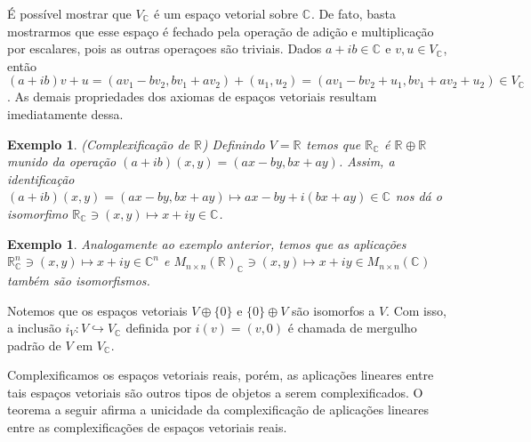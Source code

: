 \documentclass[12pt]{book}
\newtheorem{exemplo}[teorema]{Exemplo}
\newcommand{\complexificacao}[1]{#1_{\complexo{}}}
\newcommand{\complexo}[1]{\mathbb{C}^{#1}}
\newcommand{\matrizquadcomplexa}[1]{M_{#1 \times #1}(\complexo{})}
\newcommand{\matrizquadreal}[1]{M_{#1 \times #1}(\real{})}
\newcommand{\real}[1]{\mathbb{R}^{#1}}
\newcommand{\reta}{\real{}}
\begin{document}
	É possível mostrar que $\complexificacao{V}$ é um espaço vetorial sobre $\complexo{}$. De fato, basta mostrarmos que esse espaço é fechado pela operação de adição e multiplicação por escalares, pois as outras operaçoes são triviais. Dados $a+ib \in \complexo{}$ e $v,u \in \complexificacao{V}$, então $(a+ib )v+u = (av_{1}-bv_{2}, bv_{1}+ av_{2}) + (u_{1}, u_{2}) = (av_{1}-bv_{2} + u_{1}, bv_{1}+ av_{2} + u_{2}) \in \complexificacao{V}$. As demais propriedades dos axiomas de espaços vetoriais resultam imediatamente dessa.
	
	\begin{exemplo}\label{exemplo_conjugado_reta_real}
		(Complexificação de $\reta$) Definindo $V = \reta$ temos que $\complexificacao{\reta}$ é $\reta\oplus \reta$ munido da operação $(a+ib)(x,y) = (ax-by, bx+ay)$. Assim, a identificação $(a+ib)(x, y ) = (ax-by, bx+ay) \mapsto ax-by+i(bx+ay) \in \complexo{}$ nos dá o isomorfimo $\complexificacao{\reta} \ni (x,y)\mapsto x +iy\in \complexo{}$.
	\end{exemplo}
	
	\begin{exemplo}\label{exemplo_complexificacao_matrizes}
		Analogamente ao exemplo anterior, temos que as aplicações $\complexificacao{\real{n}} \ni (x,y) \mapsto x+iy \in \complexo{n}$ e  $\complexificacao{\matrizquadreal{n}} \ni (x,y) \mapsto x+iy \in \matrizquadcomplexa{n}$ também são isomorfismos.
	\end{exemplo}
	
	Notemos que os espaços vetoriais $V\oplus\{0\}$ e $\{0\}\oplus V$ são isomorfos a $V$. Com isso, a inclusão $i_{V} :V \hookrightarrow \complexificacao{V}$ definida por $i(v) = (v, 0)$ é chamada de mergulho padrão de $V$ em $\complexificacao{V}$.
	
	Complexificamos os espaços vetoriais reais, porém, as aplicações lineares entre tais espaços vetoriais são outros tipos de objetos a serem complexificados. O teorema a seguir afirma a unicidade da complexificação de aplicações lineares entre as complexificações de espaços vetoriais reais.
	
\end{document}
